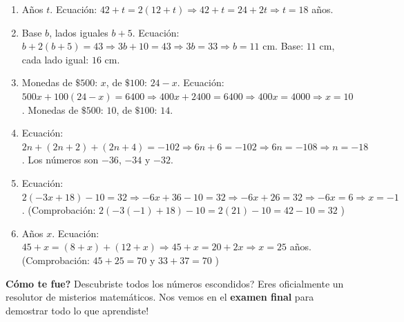\documentclass[12pt, letterpaper]{article}
\begin{document}
\begin{enumerate}[leftmargin=*, label=\textbf{\arabic*.}]
    \item Años $t$. Ecuación: $42 + t = 2(12 + t) \Rightarrow 42 + t = 24 + 2t \Rightarrow t = 18$ años.
    \item Base $b$, lados iguales $b + 5$. Ecuación: $b + 2(b + 5) = 43 \Rightarrow 3b + 10 = 43 \Rightarrow 3b = 33 \Rightarrow b = 11$ cm. Base: $11$ cm, cada lado igual: $16$ cm.
    \item Monedas de $\$500$: $x$, de $\$100$: $24 - x$. Ecuación: $500x + 100(24 - x) = 6400 \Rightarrow 400x + 2400 = 6400 \Rightarrow 400x = 4000 \Rightarrow x = 10$. Monedas de $\$500$: $10$, de $\$100$: $14$.
    \item Ecuación: $2n + (2n + 2) + (2n + 4) = -102 \Rightarrow 6n + 6 = -102 \Rightarrow 6n = -108 \Rightarrow n = -18$. Los números son $-36$, $-34$ y $-32$.
    \item Ecuación: $2(-3x + 18) - 10 = 32 \Rightarrow -6x + 36 - 10 = 32 \Rightarrow -6x + 26 = 32 \Rightarrow -6x = 6 \Rightarrow x = -1$. (Comprobación: $2(-3(-1) + 18) - 10 = 2(21) - 10 = 42 - 10 = 32$ \checkmark)
    \item Años $x$. Ecuación: $45 + x = (8 + x) + (12 + x) \Rightarrow 45 + x = 20 + 2x \Rightarrow x = 25$ años. (Comprobación: $45 + 25 = 70$ y $33 + 37 = 70$ \checkmark)
  \end{enumerate}

  \vspace{10pt}
  \begin{cuadrosolucion}
    \textbf{\textquestiondown Cómo te fue?} \textquestiondown Descubriste todos los números escondidos? Eres oficialmente un resolutor de misterios matemáticos. \textquestiondown Nos vemos en el \textbf{examen final} para demostrar todo lo que aprendiste!
  \end{cuadrosolucion}

\fi
\end{document}
